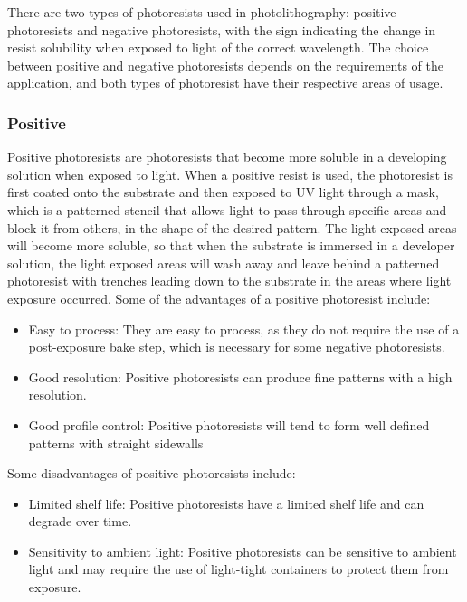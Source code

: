 There are two types of photoresists used in photolithography: positive photoresists and negative photoresists, with the sign indicating the change in resist solubility when exposed to light of the correct wavelength. The choice between positive and negative photoresists depends on the requirements of the application, and both types of photoresist have their respective areas of usage.

\subsubsection{Positive}
Positive photoresists are photoresists that become more soluble in a developing solution when exposed to light. When a positive resist is used, the photoresist is first coated onto the substrate and then exposed to UV light through a mask, which is a patterned stencil that allows light to pass through specific areas and block it from others, in the shape of the desired pattern. The light exposed areas will become more soluble, so that when the substrate is immersed in a developer solution, the light exposed areas will wash away and leave behind a patterned photoresist with trenches leading down to the substrate in the areas where light exposure occurred.
Some of the advantages of a positive photoresist include:
\begin{itemize}
    \item Easy to process: They are easy to process, as they do not require the use of a post-exposure bake step, which is necessary for some negative photoresists.
    \item Good resolution: Positive photoresists can produce fine patterns with a high resolution.
    \item Good profile control: Positive photoresists will tend to form well defined patterns with straight sidewalls
\end{itemize}
Some disadvantages of positive photoresists include:
\begin{itemize}
    \item Limited shelf life: Positive photoresists have a limited shelf life and can degrade over time.
    \item Sensitivity to ambient light: Positive photoresists can be sensitive to ambient light and may require the use of light-tight containers to protect them from exposure.
\end{itemize}

